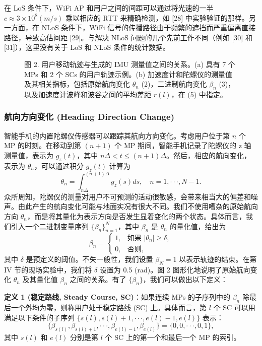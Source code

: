 \documentclass[journal]{IEEEtran}
\begin{document}
在 LoS 条件下，WiFi AP 和用户之间的间距可以通过将光速的一半 $c\approx3\times10^{8}(m/s)$ 乘以相应的 RTT 来精确检测，如 [28] 中实验验证的那样。另一方面，在 NLoS 条件下，WiFi 信号的传播路径由于频繁的遮挡而严重偏离直接路径，导致高估间距 [29]。与解决 NLoS 问题的几个先前工作不同（例如 [30] 和 [31]），这里没有关于 LoS 和 NLoS 条件的统计数据。

\begin{figure}[htbp]
\centering
\caption{图 2. 用户移动轨迹与生成的 IMU 测量值之间的关系。(a) 具有 7 个 MPs 和 2 个 SCs 的用户轨迹示例。(b) 加速度计和陀螺仪的测量值及其相关指标，包括原始航向变化 $\theta_{n}$ (2)，二进制航向变化 $\beta_{n}$ (3)，以及加速度计波峰和波谷之间的平均差距 $r(l)$，在 (5) 中指定。}
\label{fig:2}
\end{figure}

\subsubsection{航向方向变化 (Heading Direction Change)}
智能手机的内置陀螺仪传感器可以跟踪其航向方向变化。考虑用户位于第 $n$ 个 MP 的时刻。在移动到第 $(n+1)$ 个 MP 期间，智能手机记录了陀螺仪的 z 轴测量值，表示为 $g_{z}(t)$，其中 $n\Delta<t\le(n+1)\Delta$。然后，相应的航向变化，表示为 $\theta_{n}$，可以通过积分 $g_{z}(t)$ 计算为
\begin{equation}
\theta_{n}=\int_{n\Delta}^{(n+1)\Delta}g_{z}(s)ds, \quad n=1,\cdot\cdot\cdot,N-1. \label{eq:2}
\end{equation}
众所周知，陀螺仪的测量对用户不可预测的活动很敏感，会带来相当大的偏差和噪声。由此产生的航向变化可能与地面实况有很大不同。我们不使用嘈杂的原始航向方向 $\theta_{n}$，而是将其量化为表示方向是否发生显着变化的两个状态。具体而言，我们引入一个二进制变量序列 $\{\beta_{n}\}_{n=1}^{N}$，其中 $\beta_{n}$ 是 $\theta_{n}$ 的量化值，给出为
\begin{equation}
\beta_{n}=\begin{cases}1,& \text{如果 } |\theta_{n}|\ge\delta,\\ 0,& \text{否则},\end{cases} \label{eq:3}
\end{equation}
其中 $\delta$ 是预定义的阈值。不失一般性，我们设置 $\beta_{N}=1$ 以表示轨迹的结束。在第 IV 节的现场实验中，我们将 $\delta$ 设置为 0.5 (rad)。图 2 图形化地说明了原始航向变化 $\theta_{n}$ 及其量化值 $\beta_{n}$ 之间的关系。有了 $\{\beta_{n}\}$，我们可以做出以下定义：

\textbf{定义 1 (稳定路线, Steady Course, SC)}：如果连续 MPs 的子序列中的 $\beta_{n}$ 除最后一个外均为零，则称用户处于稳定路线 (SC) 上。具体而言，第 $l$ 个 SC 可以用满足以下条件的子序列 $\{s(l),s(l)+1,\cdot\cdot\cdot,e(l)-1,e(l)\}$ 表示：
\begin{equation}
\{\beta_{s(l)},\beta_{s(l)+1},\cdot\cdot\cdot,\beta_{e(l)-1},\beta_{e(l)}\}=\{0,0,\cdot\cdot\cdot,0,1\}, \label{eq:4}
\end{equation}
其中 $s(l)$ 和 $e(l)$ 分别是第 $l$ 个 SC 上的第一个和最后一个 MP 的索引。
\end{document}
